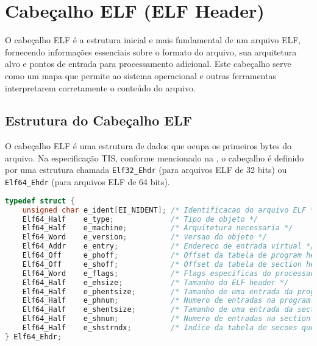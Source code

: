 \section{Cabeçalho ELF (ELF Header)}\label{sec:elf_header}

O cabeçalho ELF é a estrutura inicial e mais fundamental de um arquivo ELF, fornecendo informações essenciais sobre o formato do arquivo, sua arquitetura alvo e pontos de entrada para processamento adicional. Este cabeçalho serve como um mapa que permite ao sistema operacional e outras ferramentas interpretarem corretamente o conteúdo do arquivo.

\subsection{Estrutura do Cabeçalho ELF}\label{subsec:elf_header_structure}

O cabeçalho ELF é uma estrutura de dados que ocupa os primeiros bytes do arquivo. Na especificação TIS, conforme mencionado na , o cabeçalho é definido por uma estrutura chamada \texttt{Elf32\_Ehdr} (para arquivos ELF de 32 bits) ou \texttt{Elf64\_Ehdr} (para arquivos ELF de 64 bits).

\begin{lstlisting}[language=C, caption={Estrutura do cabeçalho ELF de 64 bits}, label={lst:elf64_header}]
typedef struct {
    unsigned char e_ident[EI_NIDENT]; /* Identificacao do arquivo ELF */
    Elf64_Half    e_type;             /* Tipo de objeto */
    Elf64_Half    e_machine;          /* Arquitetura necessaria */
    Elf64_Word    e_version;          /* Versao do objeto */
    Elf64_Addr    e_entry;            /* Endereco de entrada virtual */
    Elf64_Off     e_phoff;            /* Offset da tabela de program header */
    Elf64_Off     e_shoff;            /* Offset da tabela de section header */
    Elf64_Word    e_flags;            /* Flags especificas do processador */
    Elf64_Half    e_ehsize;           /* Tamanho do ELF header */
    Elf64_Half    e_phentsize;        /* Tamanho de uma entrada da program header table */
    Elf64_Half    e_phnum;            /* Numero de entradas na program header table */
    Elf64_Half    e_shentsize;        /* Tamanho de uma entrada da section header table */
    Elf64_Half    e_shnum;            /* Numero de entradas na section header table */
    Elf64_Half    e_shstrndx;         /* Indice da tabela de secoes que contem nomes de secoes */
} Elf64_Ehdr;
\end{lstlisting}

